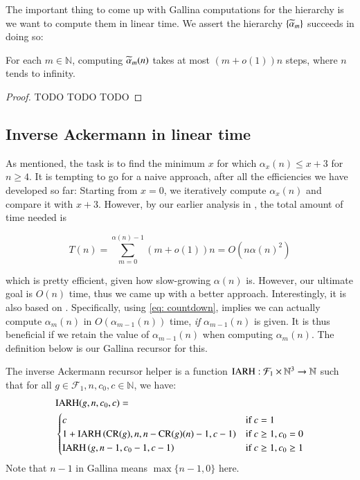 The important thing to come up with Gallina computations for the hierarchy is we want to compute them in linear time. We assert the hierarchy $\left\{\widetilde{\alpha}_m\right\}$ succeeds in doing so:

\begin{thm}  \label{thm: inv_ack_hier linear}
For each $m \in \mathbb{N}$, computing $\widetilde{\alpha}_m(n)$ takes at most $(m + o(1))n$ steps, where $n$ tends to infinity.
\end{thm}

\begin{proof}
TODO TODO TODO
\end{proof}

\subsection{Inverse Ackermann in linear time}  \label{subsec: inv_ack linear}

As mentioned, the task is to find the minimum $x$ for which $\alpha_x(n) \le x + 3$ for $n\ge 4$. It is tempting to go for a naive approach, after all the efficiencies we have developed so far: Starting from $x=0$, we iteratively compute $\alpha_x(n)$ and compare it with $x+3$. However, by our earlier analysis in , the total amount of time needed is

$$ T(n) = \sum_{m = 0}^{\alpha(n)-1}(m + o(1))n = O\left(n\alpha(n)^2\right) $$

which is pretty efficient, given how slow-growing $\alpha(n)$ is. However, our ultimate goal is $O(n)$ time, thus we came up with a better approach. Interestingly, it is also based on . Specifically, using \eqref{eq: countdown},  implies we can actually compute $\alpha_m(n)$ in $O(\alpha_{m-1}(n))$ time, \textit{if} $\alpha_{m-1}(n)$ is given. It is thus beneficial if we retain the value of $\alpha_{m-1}(n)$ when computing $\alpha_m(n)$. The definition below is our Gallina recursor for this.

\begin{defn}  \label{defn: inv_ack_recursor_helper}
The inverse Ackermann recursor helper is a function $\text{IARH} : \mathcal{F}_1\times \mathbb{N}^3 \to \mathbb{N}$ such that for all $g\in \mathcal{F}_1, n, c_0, c\in \mathbb{N}$, we have:
\begin{equation}
\begin{aligned}
& \text{IARH}(g, n, c_0, c) =  \\
& \begin{cases}
c & \text{if } c = 1 \\
1 + \text{IARH}\left(\text{CR}(g), n, n - \text{CR}(g)(n) - 1, c - 1\right) & \text{if } c \ge 1, c_0 = 0 \\
\text{IARH}\left(g, n - 1, c_0 - 1, c - 1\right) & \text{if } c \ge 1, c_0 \ge 1
\end{cases}
\end{aligned}
\end{equation}
Note that $n - 1$ in Gallina means $\max\{n-1, 0\}$ here.
\end{defn}

